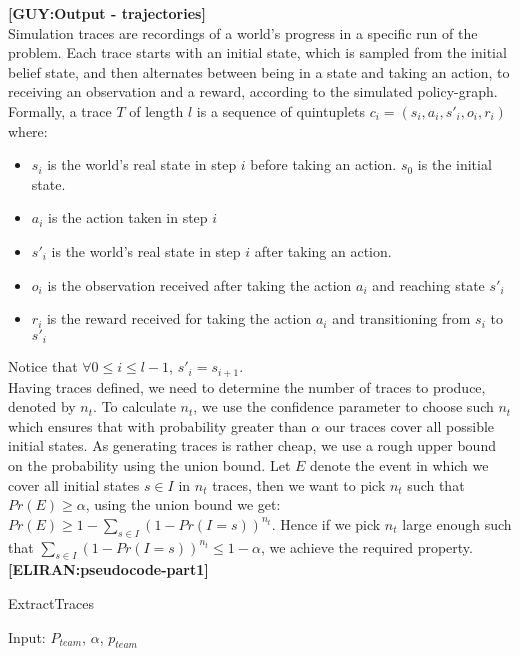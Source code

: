 \documentclass[letterpaper]{article} %
\newcommand{\eliran}[1]{\textbf{[\color{red}ELIRAN:#1]}}
\newcommand{\guy}[1]{\textbf{[\color{orange}GUY:#1]}}
\begin{document}
\guy{Output - trajectories}
\\Simulation traces are recordings of a world's progress in a specific run of the problem. Each trace starts with an initial state, which is sampled from the initial belief state, and then alternates between being in a state and taking an action, to receiving an observation and a reward, according to the simulated policy-graph. Formally, a trace $T$ of length $l$ is a sequence of quintuplets $c_i = (s_i, a_i, s'_i, o_i, r_i)$ where:
\begin{itemize}
    \item $s_i$ is the world's real state in step $i$ before taking an action. $s_0$ is the initial state.
    \item $a_i$ is the action taken in step $i$
    \item $s'_i$ is the world's real state  in step $i$ after taking an action.
    \item $o_i$ is the observation received after taking the action $a_i$ and reaching state $s'_i$
    \item $r_i$ is the reward received for taking the action $a_i$ and transitioning from $s_i$ to $s'_i$
\end{itemize}
Notice that $\forall 0\leq i \leq l-1$, $s'_i=s_{i+1}$.\\
Having traces defined, we need to determine the number of traces to produce, denoted by $n_t$.
To calculate $n_t$, we use the confidence parameter to choose such $n_t$ which ensures that with probability greater than $\alpha$ our traces cover all possible initial states.
As generating traces is rather cheap, we use a rough upper bound on the probability using the union bound. Let $E$ denote the event in which we cover all initial states $s \in I$ in $n_t$ traces, then we want to pick $n_t$ such that $Pr(E)\geq \alpha$, using the union bound we get:
$Pr(E)\geq 1-\sum_{s\in I}(1-Pr(I=s))^{n_t}$.
Hence if we pick $n_t$ large enough such that $\sum_{s\in I}(1-Pr(I=s))^{n_t} \leq 1-\alpha$, we achieve the required property.
\eliran{pseudocode-part1}
\begin{algorithm}
\caption{ExtractTraces}
\begin{algorithmic}[tbph]
\State Input: $P_{team}$, $\alpha$, $p_{team}$
\end{algorithmic}
\end{algorithm}
\end{document}
